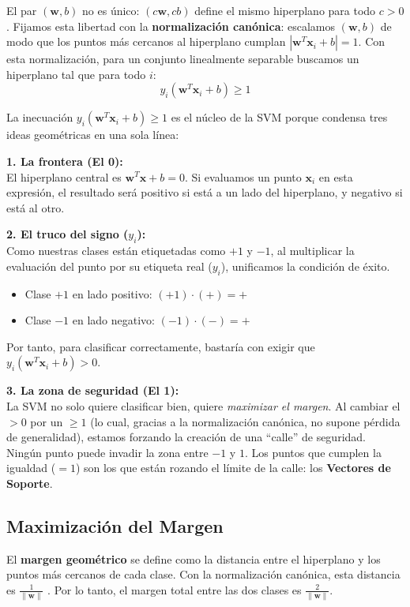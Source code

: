 \documentclass[12pt, a4paper]{article}
\begin{document}
\noindent El par $(\mathbf{w}, b)$ no es único: $(c\mathbf{w}, cb)$ define el mismo hiperplano para todo $c > 0$. Fijamos esta libertad con la \textbf{normalización canónica}: escalamos $(\mathbf{w}, b)$ de modo que los puntos más cercanos al hiperplano cumplan $|\mathbf{w}^T \mathbf{x}_i + b| = 1$. Con esta normalización, para un conjunto linealmente separable buscamos un hiperplano tal que para todo $i$:
\[ y_i(\mathbf{w}^T \mathbf{x}_i + b) \geq 1 \]

\begin{tcolorbox}[colback=blue!5!white,colframe=blue!75!black,title=\textbf{Nota Aclaratoria: Entendiendo la inecuación del margen}]
La inecuación $y_i(\mathbf{w}^T \mathbf{x}_i + b) \geq 1$ es el núcleo de la SVM porque condensa tres ideas geométricas en una sola línea:

\textbf{1. La frontera (El 0):}\\
El hiperplano central es $\mathbf{w}^T \mathbf{x} + b = 0$. Si evaluamos un punto $\mathbf{x}_i$ en esta expresión, el resultado será positivo si está a un lado del hiperplano, y negativo si está al otro.

\textbf{2. El truco del signo ($y_i$):}\\
Como nuestras clases están etiquetadas como $+1$ y $-1$, al multiplicar la evaluación del punto por su etiqueta real ($y_i$), unificamos la condición de éxito.
\begin{itemize}
    \item Clase $+1$ en lado positivo: $(+1) \cdot (+) = +$
    \item Clase $-1$ en lado negativo: $(-1) \cdot (-) = +$
\end{itemize}
Por tanto, para clasificar correctamente, bastaría con exigir que $y_i(\mathbf{w}^T \mathbf{x}_i + b) > 0$.

\textbf{3. La zona de seguridad (El 1):}\\
La SVM no solo quiere clasificar bien, quiere \textit{maximizar el margen}. Al cambiar el $> 0$ por un $\geq 1$ (lo cual, gracias a la normalización canónica, no supone pérdida de generalidad), estamos forzando la creación de una ``calle'' de seguridad. Ningún punto puede invadir la zona entre $-1$ y $1$. Los puntos que cumplen la igualdad ($=1$) son los que están rozando el límite de la calle: los \textbf{Vectores de Soporte}.
\end{tcolorbox}

\subsection{Maximización del Margen}
\noindent El \textbf{margen geométrico} se define como la distancia entre el hiperplano y los puntos más cercanos de cada clase. Con la normalización canónica, esta distancia es $\frac{1}{\|\mathbf{w}\|}$ \cite{hastie2009elements}. Por lo tanto, el margen total entre las dos clases es $\frac{2}{\|\mathbf{w}\|}$.
\end{document}
